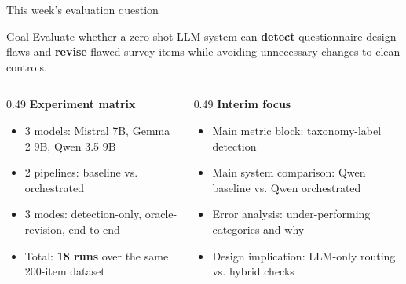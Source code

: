 \documentclass[aspectratio=169,10pt]{beamer}
\newcommand{\tight}{\setlength{\itemsep}{2pt}\setlength{\parskip}{0pt}}
\begin{document}
\begin{frame}{This week's evaluation question}
\begin{block}{Goal}
Evaluate whether a zero-shot LLM system can \textbf{detect} questionnaire-design flaws and \textbf{revise} flawed survey items while avoiding unnecessary changes to clean controls.
\end{block}

\vspace{2mm}
\begin{columns}[T,onlytextwidth]
\begin{column}{0.49\textwidth}
\textbf{Experiment matrix}
\begin{itemize}\tight
  \item 3 models: Mistral 7B, Gemma 2 9B, Qwen 3.5 9B
  \item 2 pipelines: baseline vs. orchestrated
  \item 3 modes: detection-only, oracle-revision, end-to-end
  \item Total: \textbf{18 runs} over the same 200-item dataset
\end{itemize}
\end{column}
\begin{column}{0.49\textwidth}
\textbf{Interim focus}
\begin{itemize}\tight
  \item Main metric block: taxonomy-label detection
  \item Main system comparison: Qwen baseline vs. Qwen orchestrated
  \item Error analysis: under-performing categories and why
  \item Design implication: LLM-only routing vs. hybrid checks
\end{itemize}
\end{column}
\end{columns}
\end{frame}
\end{document}
